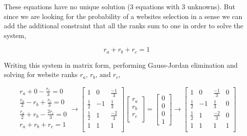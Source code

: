\documentclass[12pt]{article}
\begin{document}
These equations have no unique solution (3 equations with 3 unknowns). But since we are looking for the probability of a websites selection in a sense we can add the additional constraint that all the ranks sum to one in order to solve the system,

\begin{equation}
	r_a + r_b + r_c = 1
\end{equation}

Writing this system in matrix form, performing Gauss-Jordan elimination and solving for website ranks $r_a, \, r_b, \, \text{and } r_c$, 

\iffalse
%
%
\begin{alignat*}{4}
r_a 			& {}+{} &  0 	& {}-{} 	& \frac{r_c}{3} 	& {}={} & 0 \\
\frac{r_a}{2}   & {}-{} &  r_b 	& {}+{} 	& \frac{r_c}{3} 	& {}={} & 0 \\
\frac{r_a}{2}   & {}+{} &  r_b 	& {}-{} 	& \frac{2 r_c}{3} 	& {}={} & 0 \\
r_a 			& {}+{} &  r_b 	& {}+{} 	& r_c 				& {}={} & 1
\end{alignat*}
\fi

\[
\begin{matrix} 
r_a 			+   0 		 - 	 \frac{r_c}{3} 		 = 0 \\
\frac{r_a}{2}   -   r_b 	 + 	 \frac{r_c}{3} 		 = 0 \\
\frac{r_a}{2}   +   r_b 	 - 	 \frac{2 r_c}{3} 	 = 0 \\
r_a 		 	+   r_b 	 + 	 r_c 				 = 1 \\
\end{matrix}
%
%
\rightarrow
%
%
\left[
\begin{array}{ccc}
1 			& 0 	& \frac{-1}{3} \\
\frac{1}{2} & -1 	& \frac{1}{3} \\
\frac{1}{2} & 1 	& \frac{-2}{3} \\
1 			& 1 	& 1 \\
\end{array}
\right]
%
\begin{bmatrix}
r_a \\ 
r_b \\
r_c \\
\end{bmatrix} 
=
\begin{bmatrix}
0 \\ 
0 \\
0 \\
1
\end{bmatrix} 
%
%
\rightarrow
%
%
\left[
\begin{array}{ccc|c}
1 			& 0 	& \frac{-1}{3} &  0 \\
\frac{1}{2} & -1 	& \frac{1}{3} &  0 \\
\frac{1}{2} & 1 	& \frac{-2}{3} &  0 \\
1 			& 1 	& 1 &  1 \\
\end{array}
\right]
\]
\end{document}
